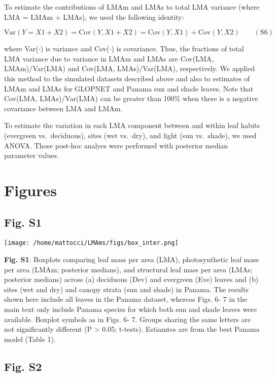 \documentclass[
  12pt,
  letterpaper,
  DIV=11,
  numbers=noendperiod]{scrartcl}
\begin{document}
To estimate the contributions of LMAm and LMAs to total LMA variance
(where LMA = LMAm + LMAs), we used the following identity:

\[
\mathrm{Var}(Y = X1 + X2) = \mathrm{Cov}(Y, X1+X2) = \mathrm{Cov}(Y,X1) + \mathrm{Cov}(Y,X2) \qquad(\mathrm{S}6)
\]

where Var(\(\cdot\)) is variance and Cov(\(\cdot\)) is covariance. Thus,
the fractions of total LMA variance due to variance in LMAm and LMAs are
Cov(LMA, LMAm)/Var(LMA) and Cov(LMA, LMAs)/Var(LMA), respectively. We
applied this method to the simulated datasets described above and also
to estimates of LMAm and LMAs for GLOPNET and Panama sun and shade
leaves. Note that Cov(LMA, LMAs)/Var(LMA) can be greater than 100\% when
there is a negative covariance between LMA and LMAm.

To estimate the variation in each LMA component between and within leaf
habits (evergreen vs.~deciduous), sites (wet vs.~dry), and light (sun
vs.~shade), we used ANOVA. Those post-hoc analyes were performed with
posterior median parameter values.

\newpage

\hypertarget{figures}{%
\section{Figures}\label{figures}}

\hypertarget{fig.-s1}{%
\subsection{Fig. S1}\label{fig.-s1}}

\texttt{[image: /home/mattocci/LMAms/figs/box\_inter.png]}

\textbf{Fig. S1}: Boxplots comparing leaf mass per area (LMA),
photosynthetic leaf mass per area (LMAm; posterior medians), and
structural leaf mass per area (LMAs; posterior medians) across (a)
deciduous (Dev) and evergreen (Eve) leaves and (b) sites (wet and dry)
and canopy strata (sun and shade) in Panama. The results shown here
include all leaves in the Panama dataset, whereas Figs. 6- 7 in the main
text only include Panama species for which both sun and shade leaves
were available. Boxplot symbols as in Figs. 6- 7. Groups sharing the
same letters are not significantly different (P \textgreater{} 0.05;
t-tests). Estiamtes are from the best Panama model (Table 1).

\newpage

\hypertarget{fig.-s2}{%
\subsection{Fig. S2}\label{fig.-s2}}
\end{document}

